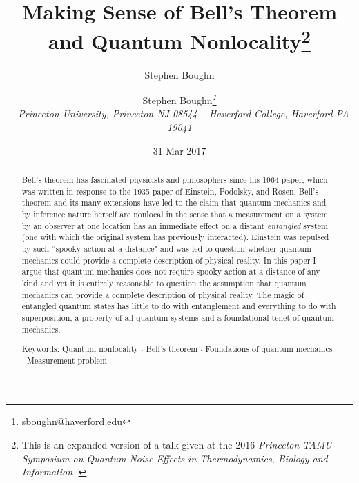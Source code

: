 \documentclass[12pt]{article}
\def\\{\hfill\break} \let\==\equiv
\begin{document}
\title{Making Sense of Bell's Theorem and Quantum Nonlocality\footnote{This is an expanded version of a talk given at the 2016 {\it Princeton-TAMU Symposium on Quantum Noise Effects in Thermodynamics, Biology and Information} \cite{Bou16}.}}
\author {Stephen Boughn{\small\it\thanks{sboughn@haverford.edu}}\author{Stephen Boughn}
\\[2mm]
~ \it Princeton University, Princeton NJ 08544 \\
~ \it Haverford College, Haverford PA 19041}

\date{31 Mar 2017}

\maketitle


\begin{abstract}
Bell's theorem has fascinated physicists and philosophers since his 1964 paper, which was written in response to the 1935 paper of Einstein, Podolsky, and Rosen. Bell's theorem and its many extensions have led to the claim that quantum mechanics and by inference nature herself are nonlocal in the sense that a measurement on a system by an observer at one location has an immediate effect on a distant {\it entangled} system (one with which the original system has previously interacted). Einstein was repulsed by such ``spooky action at a distance" and was led to question whether quantum mechanics could provide a complete description of physical reality. In this paper I argue that quantum mechanics does not require spooky action at a distance of any kind and yet it is entirely reasonable to question the assumption that quantum mechanics can provide a complete description of physical reality. The magic of entangled quantum states has little to do with entanglement and everything to do with superposition, a property of all quantum systems and a foundational tenet of quantum mechanics.

\\ {\small{Keywords: Quantum nonlocality $\cdot$ Bell's theorem $\cdot$ Foundations of quantum mechanics $\cdot$ Measurement problem}}

\end{abstract}

\maketitle
\end{document}
